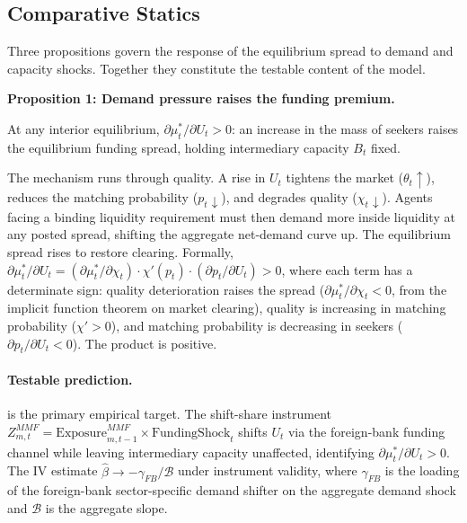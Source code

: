 \subsection{Comparative Statics}
\label{subsec:comparative-statics}

Three propositions govern the response of the equilibrium spread to demand and
capacity shocks. Together they constitute the testable content of the model.

\bigskip
\noindent\textbf{Proposition 1: Demand pressure raises the funding premium.}

\begin{proposition}
  \label{prop:demand}
  At any interior equilibrium, $\partial \mu_t^* / \partial U_t > 0$: an
  increase in the mass of seekers raises the equilibrium funding spread, holding
  intermediary capacity $B_t$ fixed.
\end{proposition}

The mechanism runs through quality. A rise in $U_t$ tightens the market
($\theta_t \uparrow$), reduces the matching probability ($p_t \downarrow$), and
degrades quality ($\chi_t \downarrow$). Agents facing a binding liquidity
requirement must then demand more inside liquidity at any posted spread, shifting
the aggregate net-demand curve up. The equilibrium spread rises to restore
clearing. Formally, $\partial \mu_t^* / \partial U_t = (\partial \mu_t^* /
\partial \chi_t) \cdot \chi'(p_t) \cdot (\partial p_t / \partial U_t) > 0$,
where each term has a determinate sign: quality deterioration raises the spread
($\partial \mu_t^* / \partial \chi_t < 0$, from the implicit function theorem on
market clearing), quality is increasing in matching probability ($\chi' > 0$),
and matching probability is decreasing in seekers ($\partial p_t / \partial U_t
< 0$). The product is positive.

\paragraph{Testable prediction.}  is the primary empirical target.
The shift-share instrument $Z^{MMF}_{m,t} = \text{Exposure}^{MMF}_{m,t-1}
\times \text{FundingShock}_t$ shifts $U_t$ via the foreign-bank funding channel
while leaving intermediary capacity unaffected, identifying $\partial \mu_t^* /
\partial U_t > 0$. The IV estimate $\hat{\beta} \to -\gamma_{FB}/\mathcal{B}$
under instrument validity, where $\gamma_{FB}$ is the loading of the
foreign-bank sector-specific demand shifter on the aggregate demand shock and
$\mathcal{B}$ is the aggregate slope.

